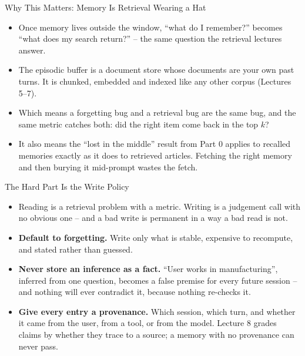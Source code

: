 \begin{frame}{Why This Matters: Memory Is Retrieval Wearing a Hat}
\begin{itemize}
  \item Once memory lives outside the window, ``what do I remember?'' becomes ``what does my search return?'' -- the same question the retrieval lectures answer.
  \pause
  \item The episodic buffer is a document store whose documents are your own past turns. It is chunked, embedded and indexed like any other corpus (Lectures 5--7).
  \pause
  \item Which means a forgetting bug and a retrieval bug are the same bug, and the same metric catches both: did the right item come back in the top $k$?
  \pause
  \item It also means the ``lost in the middle'' result from Part 0 applies to recalled memories exactly as it does to retrieved articles. Fetching the right memory and then burying it mid-prompt wastes the fetch.
\end{itemize}
\end{frame}

\begin{frame}{The Hard Part Is the Write Policy}
\begin{itemize}
  \item Reading is a retrieval problem with a metric. Writing is a judgement call with no obvious one -- and a bad write is permanent in a way a bad read is not.
  \pause
  \item \textbf{Default to forgetting.} Write only what is stable, expensive to recompute, and stated rather than guessed.
  \pause
  \item \textbf{Never store an inference as a fact.} ``User works in manufacturing'', inferred from one question, becomes a false premise for every future session -- and nothing will ever contradict it, because nothing re-checks it.
  \pause
  \item \textbf{Give every entry a provenance.} Which session, which turn, and whether it came from the user, from a tool, or from the model. Lecture 8 grades claims by whether they trace to a source; a memory with no provenance can never pass.
\end{itemize}
\end{frame}

